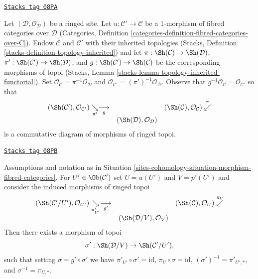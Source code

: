\begin{definition}
\label{sites-cohomology-situation-morphism-fibred-categories}
\href{https://stacks.math.columbia.edu/tag/08PA}{\texttt{Stacks tag 08PA}}

Let $(\mathcal{D}, \mathcal{O}_\mathcal{D})$ be a ringed site.
Let $u : \mathcal{C}' \to \mathcal{C}$ be a $1$-morphism of fibred
categories over $\mathcal{D}$
(Categories, Definition \ref{categories-definition-fibred-categories-over-C}).
Endow $\mathcal{C}$ and $\mathcal{C}'$ with their inherited topologies
(Stacks, Definition \ref{stacks-definition-topology-inherited})
and let
$\pi : \Sh(\mathcal{C}) \to \Sh(\mathcal{D})$,
$\pi' : \Sh(\mathcal{C}') \to \Sh(\mathcal{D})$, and
$g : \Sh(\mathcal{C}') \to \Sh(\mathcal{C})$
be the corresponding morphisms of topoi
(Stacks, Lemma \ref{stacks-lemma-topology-inherited-functorial}).
Set $\mathcal{O}_\mathcal{C} = \pi^{-1}\mathcal{O}_\mathcal{D}$
and $\mathcal{O}_{\mathcal{C}'} = (\pi')^{-1}\mathcal{O}_\mathcal{D}$.
Observe that $g^{-1}\mathcal{O}_\mathcal{C} = \mathcal{O}_{\mathcal{C}'}$
so that
$$
\begin{array}{ccc}(\Sh(\mathcal{C}'), \mathcal{O}_{\mathcal{C}'}) \underset{\pi'}{\searrow}\underset{g}{\longrightarrow} &  & (\Sh(\mathcal{C}), \mathcal{O}_\mathcal{C}) \overset{\pi}{\swarrow} \\  & (\Sh(\mathcal{D}), \mathcal{O}_\mathcal{D}) & \end{array}
$$
is a commutative diagram of morphisms of ringed topoi.
\end{definition}

\begin{lemma}
\label{sites-cohomology-lemma-morphism-fibred-categories-with-object}
\href{https://stacks.math.columbia.edu/tag/08PB}{\texttt{Stacks tag 08PB}}

Assumptions and notation as in
Situation \ref{sites-cohomology-situation-morphism-fibred-categories}.
For $U' \in \Ob(\mathcal{C}')$ set $U = u(U')$ and $V = p'(U')$ and
consider the induced morphisms of ringed topoi
$$
\begin{array}{ccc}(\Sh(\mathcal{C}'/U'), \mathcal{O}_{U'}) \underset{\pi'_{U'}}{\searrow}\underset{g'}{\longrightarrow} &  & (\Sh(\mathcal{C}), \mathcal{O}_U) \overset{\pi_U}{\swarrow} \\  & (\Sh(\mathcal{D}/V), \mathcal{O}_V) & \end{array}
$$
Then there exists a morphism of topoi
$$
\sigma' : \Sh(\mathcal{D}/V) \to \Sh(\mathcal{C}'/U'),
$$
such that setting $\sigma = g' \circ \sigma'$ we have
$\pi'_{U'} \circ \sigma' = \text{id}$, $\pi_U \circ \sigma = \text{id}$,
$(\sigma')^{-1} = \pi'_{U', *}$, and $\sigma^{-1} = \pi_{U, *}$.
\end{lemma}

